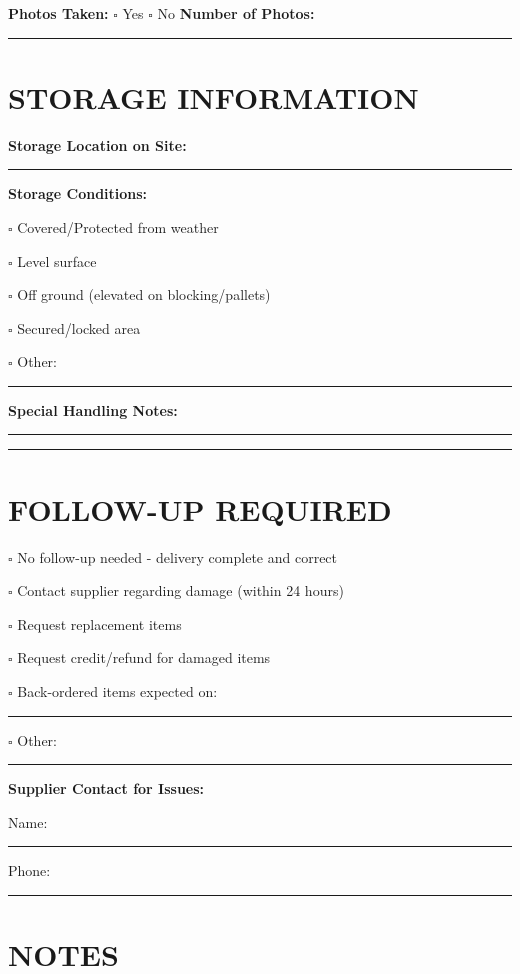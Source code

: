 \documentclass[11pt,letterpaper]{article}
\begin{document}
\textbf{Photos Taken:} $\square$ Yes $\square$ No \hspace{0.5in} \textbf{Number of Photos:} \rule{2cm}{0.4pt}

\vspace{6pt}

\section*{STORAGE INFORMATION}

\textbf{Storage Location on Site:} \rule{8cm}{0.4pt}

\textbf{Storage Conditions:}

$\square$ Covered/Protected from weather

$\square$ Level surface

$\square$ Off ground (elevated on blocking/pallets)

$\square$ Secured/locked area

$\square$ Other: \rule{7cm}{0.4pt}

\textbf{Special Handling Notes:}

\rule{14cm}{0.4pt}

\rule{14cm}{0.4pt}

\newpage

\section*{FOLLOW-UP REQUIRED}

$\square$ No follow-up needed - delivery complete and correct

$\square$ Contact supplier regarding damage (within 24 hours)

$\square$ Request replacement items

$\square$ Request credit/refund for damaged items

$\square$ Back-ordered items expected on: \rule{5cm}{0.4pt}

$\square$ Other: \rule{9cm}{0.4pt}

\vspace{6pt}

\textbf{Supplier Contact for Issues:}

Name: \rule{7cm}{0.4pt} Phone: \rule{4cm}{0.4pt}

\vspace{6pt}

\section*{NOTES}
\end{document}
